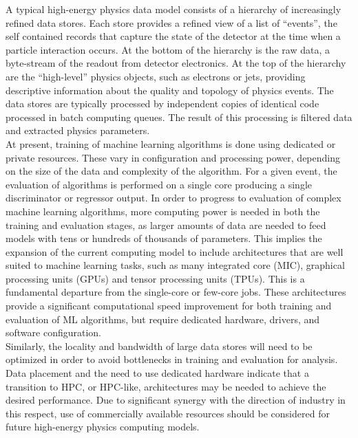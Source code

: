 \vspace{10pt} %
A typical high-energy physics data model consists of a hierarchy of increasingly refined data stores. Each store provides a refined view of a list of ``events'', the self contained records that capture the state of the detector at the time when a particle interaction occurs. At the bottom of the hierarchy is the raw data, a byte-stream of the readout from detector electronics. At the top of the hierarchy are the ``high-level'' physics objects, such as electrons or jets, providing descriptive information about the quality and topology of physics events. The data stores are typically processed by independent copies of identical code processed in batch computing queues. The result of this processing is filtered data and extracted physics parameters.\\%

At present, training of machine learning algorithms is done using dedicated or private resources. These vary in configuration and processing power, depending on the size of the data and complexity of the algorithm. For a given event, the evaluation of algorithms is performed on a single core producing a single discriminator or regressor output. In order to progress to evaluation of complex machine learning algorithms, more computing power is needed in both the training and evaluation stages, as larger amounts of data are needed to feed models with tens or hundreds of thousands of parameters. This implies the expansion of the current computing model to include architectures that are well suited to machine learning tasks, such as many integrated core (MIC), graphical processing units (GPUs) and tensor processing units (TPUs). This is a fundamental departure from the single-core or few-core jobs. These architectures provide a significant computational speed improvement for both training and evaluation of ML algorithms, but require dedicated hardware, drivers, and software configuration.\\

Similarly, the locality and bandwidth of large data stores will need to be optimized in order to avoid bottlenecks in training and evaluation for analysis. Data placement and the need to use dedicated hardware indicate that a transition to HPC, or HPC-like, architectures may be needed to achieve the desired performance. Due to significant synergy with the direction of industry in this respect, use of commercially available resources should be considered for future high-energy physics computing models.\\

